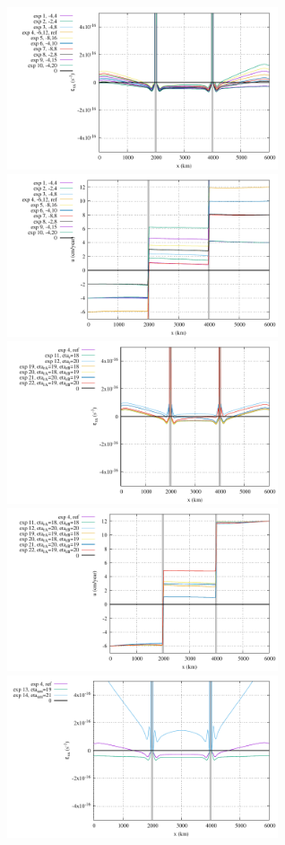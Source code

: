 \begin{center}
\includegraphics[width=8cm]{python_codes/fieldstone_148/results/fig1_exx_surface}
\includegraphics[width=8cm]{python_codes/fieldstone_148/results/fig1_u_surface}\\
\includegraphics[width=8cm]{python_codes/fieldstone_148/results/fig2_exx_surface}
\includegraphics[width=8cm]{python_codes/fieldstone_148/results/fig2_u_surface}\\
\includegraphics[width=8cm]{python_codes/fieldstone_148/results/fig3_exx_surface}

\end{center}
